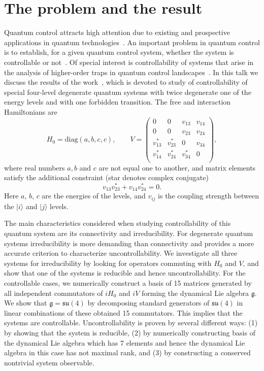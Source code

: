 \documentclass[12pt]{llncs}
\begin{document}
\section{The problem and the result}
Quantum control attracts high attention due to existing and prospective applications in quantum technologies~\cite{Moore2011,Koch2022}. An important problem in quantum control is to establish, for a given quantum control system, whether the system is controllable or not~\cite{Turinici2001,Albertini2003,BoscainCMP2015,PechenPRA2011}. Of special interest is controllability of systems that arise in the analysis of higher-order traps in quantum control landscapes~\cite{PechenPRL2011}. In this talk we discuss the results of the work~\cite{Myachkova}, which is devoted to study of controllability of special four-level degenerate quantum systems with twice degenerate one of the energy levels and with one forbidden transition. The free and interaction Hamiltonians are
\begin{equation}\label{mmmeq2}
H_0=\mathrm{diag}(a,b,c,c),\qquad
V=\begin{pmatrix}
0& 0 & v_{13} & v_{14} \\
0&  0 & v_{23}  & v_{24} \\
v^\ast_{13}& v^\ast_{23}& 0 &  v_{34} \\
v^\ast_{14}& v^\ast_{24}& v_{34}^\ast & 0 \\
\end{pmatrix},
\end{equation}
where real numbers $a,b$ and $c$ are not equal one to another, and matrix elements satisfy the additional constraint (star denotes complex conjugate)
\begin{equation}\label{Eq:Constraint}
v_{13}v^\ast_{23} +v_{14}v^\ast_{24}=0.
\end{equation}
Here $a$, $b$, $c$ are the energies of the levels, and $v_{ij}$ is the coupling strength between the $|i\rangle$ and $|j\rangle$ levels. 

The main characteristics considered when studying controllability of this quantum system are its connectivity and irreducibility. For degenerate quantum systems irreducibility is more demanding than connectivity and provides a more accurate criterion to characterize un\-cont\-rol\-la\-bi\-li\-ty. 
We investigate all three systems for irreducibility by looking for operators commuting with $H_0$ and $V$, and show that one of the systems is reducible and hence uncontrollability.
For the controllable cases, we numerically construct a basis of 15 matrices generated by all independent commutators of $iH_0$ and $iV$ forming the dynamical Lie algebra ${\mathfrak g}$. We show that $\mathfrak g=\mathfrak{su}(4)$ by decomposing standard generators of $\mathfrak{su}(4)$ in linear combinations of these obtained 15 commutators. This implies that the systems are controllable. Uncontrollability is proven by several different ways: (1) by showing that the system is reducible, (2) by numerically constructing basis of the dynamical Lie algebra which has 7 elements and hence the dynamical Lie algebra in this case has not maximal rank, and (3) by constructing a conserved nontrivial system observable.
\end{document}
